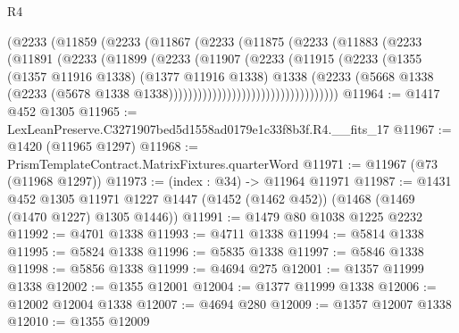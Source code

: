 \begin{lexlean}{R4}
\begin{coremodule}
                              (@2233
                                (@11859
                                  (@2233
                                    (@11867
                                      (@2233
                                        (@11875
                                          (@2233
                                            (@11883
                                              (@2233
                                                (@11891
                                                  (@2233
                                                    (@11899
                                                      (@2233
                                                        (@11907
                                                          (@2233
                                                            (@11915
                                                              (@2233
                                                                (@1355
                                                                  (@1357 @11916 @1338)
                                                                  (@1377 @11916 @1338)
                                                                  @1338
                                                                  (@2233
                                                                    (@5668
                                                                      @1338
                                                                      (@2233
                                                                        (@5678
                                                                          @1338
                                                                          @1338)))))))))))))))))))))))))))))))))))
@11964 := @1417 @452 @1305
@11965 := LexLeanPreserve.C3271907bed5d1558ad0179e1c33f8b3f.R4.__fits_17
@11967 := @1420 (@11965 @1297)
@11968 := PrismTemplateContract.MatrixFixtures.quarterWord
@11971 := @11967 (@73 (@11968 @1297))
@11973 := (index : @34) -> @11964 @11971
@11987 := @1431
    @452
    @1305
    @11971
    @1227
    @1447
    (@1452 (@1462 @452))
    (@1468 (@1469 (@1470 @1227) @1305 @1446))
@11991 := @1479 @80 @1038 @1225 @2232
@11992 := @4701 @1338
@11993 := @4711 @1338
@11994 := @5814 @1338
@11995 := @5824 @1338
@11996 := @5835 @1338
@11997 := @5846 @1338
@11998 := @5856 @1338
@11999 := @4694 @275
@12001 := @1357 @11999 @1338
@12002 := @1355 @12001
@12004 := @1377 @11999 @1338
@12006 := @12002 @12004 @1338
@12007 := @4694 @280
@12009 := @1357 @12007 @1338
@12010 := @1355 @12009

\end{coremodule}
\end{lexlean}
